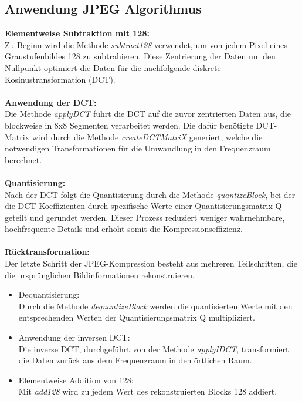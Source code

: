 \documentclass[12pt]{article}
\begin{document}
		\subsection{Anwendung JPEG Algorithmus}
\textbf{Elementweise Subtraktion mit 128:} \\
Zu Beginn wird die Methode \textit{subtract128} verwendet, um von jedem Pixel eines Graustufenbildes 128 zu subtrahieren. Diese Zentrierung der Daten um den Nullpunkt optimiert die Daten für die nachfolgende diskrete Kosinustransformation (DCT). \\
\\
\textbf{Anwendung der DCT:} \\
Die Methode \textit{applyDCT} führt die DCT auf die zuvor zentrierten Daten aus, die blockweise in 8x8 Segmenten verarbeitet werden. Die dafür benötigte DCT-Matrix wird durch die Methode \textit{createDCTMatriX} generiert, welche die notwendigen Transformationen für die Umwandlung in den Frequenzraum berechnet. \\
\\
\textbf{Quantisierung:} \\
Nach der DCT folgt die Quantisierung durch die Methode \textit{quantizeBlock}, bei der die DCT-Koeffizienten durch spezifische Werte einer Quantisierungsmatrix Q geteilt und gerundet werden. Dieser Prozess reduziert weniger wahrnehmbare, hochfrequente Details und erhöht somit die Kompressionseffizienz.\\
\\
\textbf{Rücktransformation:} \\
Der letzte Schritt der JPEG-Kompression besteht aus mehreren Teilschritten, die die ursprünglichen Bildinformationen rekonstruieren.

\begin{itemize}
    \item Dequantisierung: \\
Durch die Methode \textit{dequantizeBlock} werden die quantisierten Werte mit den entsprechenden Werten der Quantisierungsmatrix Q multipliziert.
\item Anwendung der inversen DCT: \\
Die inverse DCT, durchgeführt von der Methode \textit{applyIDCT}, transformiert die Daten zurück aus dem Frequenzraum in den örtlichen Raum. 
\item Elementweise Addition von 128: \\
Mit \textit{add128} wird zu jedem Wert des rekonstruierten Blocks 128 addiert. 
\end{itemize}
		
\end{document}
